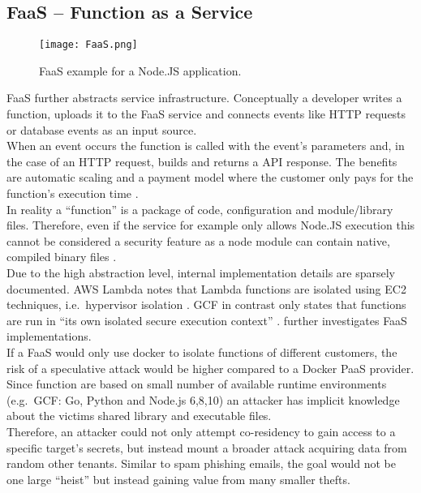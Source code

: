 \documentclass[conference,compsoc,final,a4paper]{IEEEtran}
\begin{document}
\subsection{\acs{FaaS} -- Function as a Service}
\begin{figure}[!ht]
\centering
\texttt{[image: FaaS.png]}
\caption{\ac{FaaS} example for a Node.JS application.}
\label{virtmem}
\end{figure}
\acs{FaaS} further abstracts service infrastructure. Conceptually a developer writes a function, uploads it to the \acs{FaaS} service and connects events like HTTP requests or database events as an input source. \\
When an event occurs the function is called with the event's parameters and, in the case of an HTTP request, builds and returns a API response. The benefits are automatic scaling and a payment model where the customer only pays for the function's execution time \cite{lambdaFeatures}. \\
In reality a \enquote{function} is a package of code, configuration and module/library files. Therefore, even if the service for example only allows Node.JS execution this cannot be considered a security feature as a node module can contain native, compiled binary files \cite{lambdaFaq}. \\
Due to the high abstraction level, internal implementation details are sparsely documented. \ac{AWS} Lambda notes that Lambda functions are isolated using EC2 techniques, i.e.\ hypervisor isolation \cite{lambdaFaq}. \ac{GCF} in contrast only states that functions are run in \enquote{its own isolated secure execution context} \cite{cloudFunc}. \textcite{wang2018peeking} further investigates \acs{FaaS} implementations. \\
If a \acs{FaaS} would only use docker to isolate functions of different customers, the risk of a speculative attack would be higher compared to a Docker \ac{PaaS} provider. Since function are based on small number of available runtime environments (e.g.\ \ac{GCF}: Go, Python and Node.js 6,8,10) \cite{cloudFunc} an attacker has implicit knowledge about the victims shared library and executable files. \\
Therefore, an attacker could not only attempt co-residency to gain access to a specific target's secrets, but instead mount a broader attack acquiring data from random other tenants. Similar to spam phishing emails, the goal would not be one large \enquote{heist} but instead gaining value from many smaller thefts.
\end{document}
